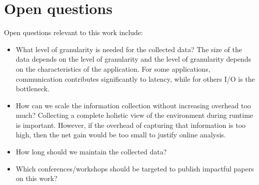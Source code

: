 \section{Open questions}
Open questions relevant to this work include:

\begin{itemize}
 \item What level of granularity is needed for the collected data?   The size of the data depends on the level of granularity and the level of granularity depends on the characteristics of the application.  For some applications, communication contributes significantly to latency, while for others I/O is the bottleneck. 
\item How can we scale the information collection without increasing overhead too much? Collecting a complete holistic view of the environment during runtime is important. However, if the overhead of capturing that information is too high,
then the net gain would be too small to justify online analysis. 
\item How long should we maintain the collected data?
\item Which conferences/workshops should be targeted to publish impactful papers on this work?
\end{itemize}

